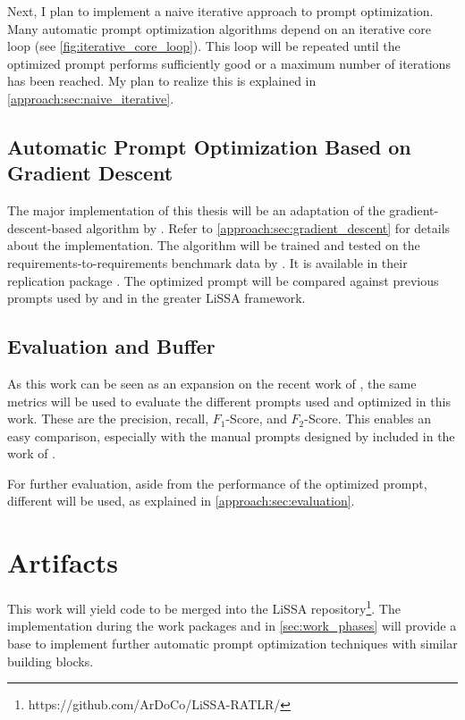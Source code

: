 Next, I plan to implement a naive iterative approach to prompt optimization. Many automatic prompt optimization algorithms \citeiterative depend on an iterative core loop (see \autoref{fig:iterative_core_loop}). This loop will be repeated until the optimized prompt performs sufficiently good or a maximum number of iterations has been reached. My plan to realize this is explained in \autoref{approach:sec:naive_iterative}.

\subsection{Automatic Prompt Optimization Based on Gradient Descent}
\label{phase_gradient_descent}
The major implementation of this thesis will be an adaptation of the gradient-descent-based \APO algorithm by . Refer to \autoref{approach:sec:gradient_descent} for details about the implementation.
The \APO algorithm will be trained and tested on the requirements-to-requirements benchmark data by \citeauthor{hey2025RequirementsTraceability}. It is available in their replication package \cite{hey2025ReplicationPackage}. The optimized prompt will be compared against previous prompts used by \citeauthor{fuchss2025LiSSAGeneric} and \citeauthor{hey2025RequirementsTraceability} in the greater LiSSA framework.


\subsection{Evaluation and Buffer}
\label{phase_evaluation}
As this work can be seen as an expansion on the recent work of , the same metrics will be used to evaluate the different prompts used and optimized in this work. These are the precision, recall, $F_1$-Score, and $F_2$-Score. This enables an easy comparison, especially with the manual prompts designed by  included in the work of \citeauthor{hey2025RequirementsTraceability}.

For further evaluation, aside from the performance of the optimized prompt, different \LLMs will be used, as explained in \autoref{approach:sec:evaluation}.




\section{Artifacts}
\label{sec:work_artifacts}
This work will yield code to be merged into the LiSSA repository\footnote{https://github.com/ArDoCo/LiSSA-RATLR/}. The implementation during the work packages  and  in \autoref{sec:work_phases} will provide a base to implement further automatic prompt optimization techniques with similar building blocks.

